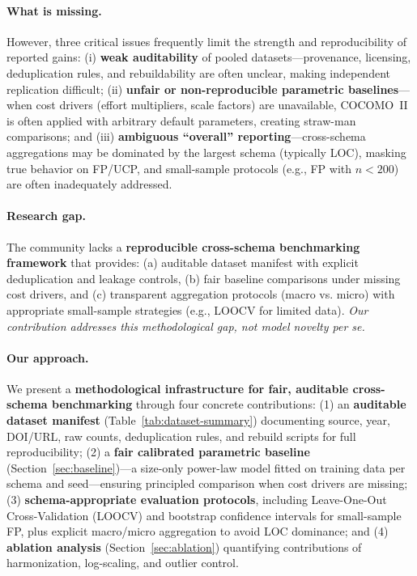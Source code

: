 \documentclass{ieeeaccess}
\begin{document}
\paragraph{What is missing.}
However, three critical issues frequently limit the strength and reproducibility of reported gains: 
(i) \textbf{weak auditability} of pooled datasets—provenance, licensing, deduplication rules, and rebuildability are often unclear, making independent replication difficult; 
(ii) \textbf{unfair or non-reproducible parametric baselines}—when cost drivers (effort multipliers, scale factors) are unavailable, COCOMO~II is often applied with arbitrary default parameters, creating straw-man comparisons; and 
(iii) \textbf{ambiguous ``overall'' reporting}—cross-schema aggregations may be dominated by the largest schema (typically LOC), masking true behavior on FP/UCP, and small-sample protocols (e.g., FP with $n<200$) are often inadequately addressed.

\paragraph{Research gap.}
The community lacks a \textbf{reproducible cross-schema benchmarking framework} that provides: (a) auditable dataset manifest with explicit deduplication and leakage controls, (b) fair baseline comparisons under missing cost drivers, and (c) transparent aggregation protocols (macro vs. micro) with appropriate small-sample strategies (e.g., LOOCV for limited data). \textit{Our contribution addresses this methodological gap, not model novelty per se.}

\paragraph{Our approach.}
We present a \textbf{methodological infrastructure for fair, auditable cross-schema benchmarking} through four concrete contributions: 
(1) an \textbf{auditable dataset manifest} (Table~\ref{tab:dataset-summary}) documenting source, year, DOI/URL, raw counts, deduplication rules, and rebuild scripts for full reproducibility; 
(2) a \textbf{fair calibrated parametric baseline} (Section~\ref{sec:baseline})—a size-only power-law model fitted on training data per schema and seed—ensuring principled comparison when cost drivers are missing; 
(3) \textbf{schema-appropriate evaluation protocols}, including Leave-One-Out Cross-Validation (LOOCV) and bootstrap confidence intervals for small-sample FP, plus explicit macro/micro aggregation to avoid LOC dominance; and 
(4) \textbf{ablation analysis} (Section~\ref{sec:ablation}) quantifying contributions of harmonization, log-scaling, and outlier control.
\end{document}
